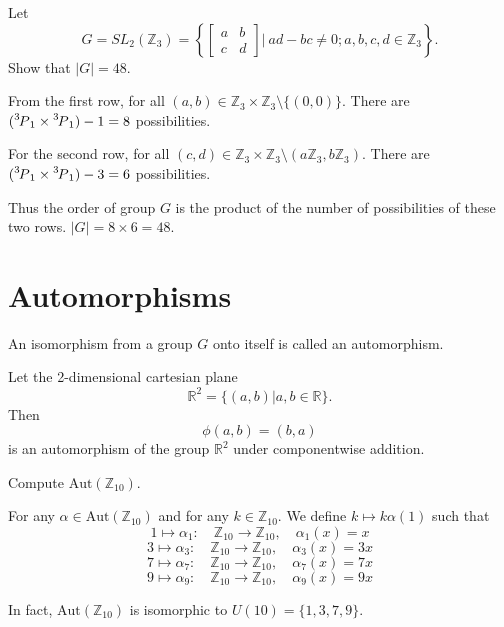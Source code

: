 \begin{example}
    Let 
    \[
        G = SL_2(\mathbb{Z}_3) = \left\{ \begin{bmatrix}
        a & b\\ c & d
        \end{bmatrix} \bigg \vert \> ad-bc \neq 0; a, b, c, d \in \mathbb{Z}_3 \right\}.
    \]
    Show that $|G| = 48$.
\end{example}
\begin{solution}
    From the first row, for all $(a,b) \in \mathbb{Z}_3 \times \mathbb{Z}_3 \setminus \{ (0,0)\}$. There are 
    $(\perm[3]{1} \times \perm[3]{1}) - 1 = 8$ possibilities.

    For the second row, for all $(c,d) \in \mathbb{Z}_3 \times \mathbb{Z}_3 \setminus (a\mathbb{Z}_3, b\mathbb{Z}_3)$.
    There are $(\perm[3]{1} \times \perm[3]{1}) - 3 = 6$ possibilities.

    Thus the order of group $G$ is the product of the number of possibilities of these two rows. $|G| = 8 \times 6 = 48$.
\end{solution}

\section{Automorphisms}

\begin{definition}[Automorphisms]
    An isomorphism from a group $G$ onto itself is called an automorphism.
\end{definition}

\begin{example}
    Let the 2-dimensional cartesian plane
    \[
        \mathbb{R}^2 = \{ (a,b) | a, b \in \mathbb{R} \}.
    \]
    Then
    \[
        \phi(a,b) = (b,a)
    \]
    is an automorphism of the group $\mathbb{R}^2$ under componentwise addition.
\end{example}

\begin{example}
    Compute $\text{Aut}(\mathbb{Z}_{10})$.
\end{example}
\begin{solution}
    For any $\alpha \in \text{Aut}(\mathbb{Z}_{10})$ and for any $k \in \mathbb{Z}_{10}$. We define $k \mapsto k \alpha(1)$ such that 
    \[
        1 \mapsto \alpha_1 :\quad \mathbb{Z}_{10} \to \mathbb{Z}_{10}, \quad \alpha_1(x) = x
    \]
    \[
        3 \mapsto \alpha_3 :\quad \mathbb{Z}_{10} \to \mathbb{Z}_{10}, \quad \alpha_3(x) = 3x
    \]
    \[
        7 \mapsto \alpha_7 :\quad \mathbb{Z}_{10} \to \mathbb{Z}_{10}, \quad \alpha_7(x) = 7x
    \]
    \[
        9 \mapsto \alpha_9 :\quad \mathbb{Z}_{10} \to \mathbb{Z}_{10}, \quad \alpha_9(x) = 9x
    \]

    In fact, $\text{Aut}(\mathbb{Z}_{10})$ is isomorphic to $U(10) = \{ 1, 3, 7, 9\}$.
\end{solution}

